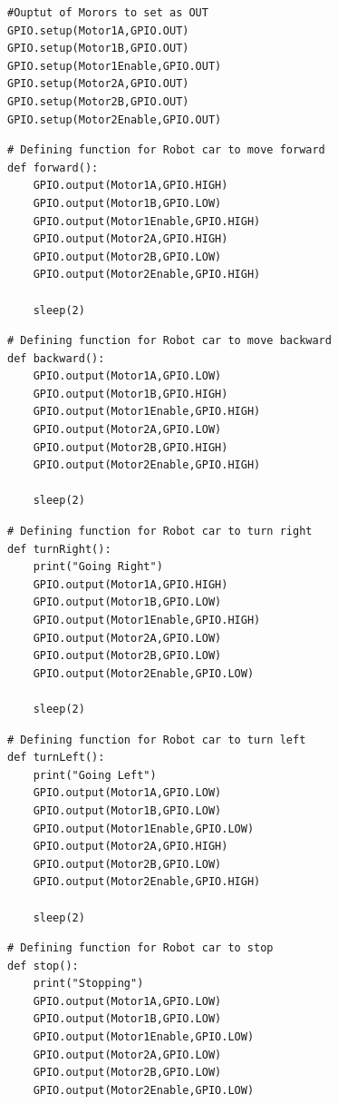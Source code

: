 \documentclass[sigconf]{acmart}
\begin{document}
\begin{verbatim}
#Ouptut of Morors to set as OUT
GPIO.setup(Motor1A,GPIO.OUT)
GPIO.setup(Motor1B,GPIO.OUT)
GPIO.setup(Motor1Enable,GPIO.OUT)
GPIO.setup(Motor2A,GPIO.OUT)
GPIO.setup(Motor2B,GPIO.OUT)
GPIO.setup(Motor2Enable,GPIO.OUT)

\end{verbatim}

\begin{verbatim}
# Defining function for Robot car to move forward
def forward():
	GPIO.output(Motor1A,GPIO.HIGH)
	GPIO.output(Motor1B,GPIO.LOW)
	GPIO.output(Motor1Enable,GPIO.HIGH) 
	GPIO.output(Motor2A,GPIO.HIGH)
	GPIO.output(Motor2B,GPIO.LOW)
	GPIO.output(Motor2Enable,GPIO.HIGH) 

	sleep(2)
\end{verbatim}

\begin{verbatim}
# Defining function for Robot car to move backward
def backward():
	GPIO.output(Motor1A,GPIO.LOW)
	GPIO.output(Motor1B,GPIO.HIGH)
	GPIO.output(Motor1Enable,GPIO.HIGH)
	GPIO.output(Motor2A,GPIO.LOW)
	GPIO.output(Motor2B,GPIO.HIGH)
	GPIO.output(Motor2Enable,GPIO.HIGH)

	sleep(2)
\end{verbatim}

\begin{verbatim}
# Defining function for Robot car to turn right
def turnRight():
	print("Going Right")
	GPIO.output(Motor1A,GPIO.HIGH)
	GPIO.output(Motor1B,GPIO.LOW)
	GPIO.output(Motor1Enable,GPIO.HIGH)
	GPIO.output(Motor2A,GPIO.LOW)
	GPIO.output(Motor2B,GPIO.LOW)
	GPIO.output(Motor2Enable,GPIO.LOW)

	sleep(2)
\end{verbatim}

\begin{verbatim}
# Defining function for Robot car to turn left
def turnLeft():
	print("Going Left")
	GPIO.output(Motor1A,GPIO.LOW)
	GPIO.output(Motor1B,GPIO.LOW)
	GPIO.output(Motor1Enable,GPIO.LOW)
	GPIO.output(Motor2A,GPIO.HIGH)
	GPIO.output(Motor2B,GPIO.LOW)
	GPIO.output(Motor2Enable,GPIO.HIGH)

	sleep(2)
\end{verbatim}

\begin{verbatim}
# Defining function for Robot car to stop
def stop():
	print("Stopping")
	GPIO.output(Motor1A,GPIO.LOW)
	GPIO.output(Motor1B,GPIO.LOW)
	GPIO.output(Motor1Enable,GPIO.LOW)
	GPIO.output(Motor2A,GPIO.LOW)
	GPIO.output(Motor2B,GPIO.LOW)
	GPIO.output(Motor2Enable,GPIO.LOW)
\end{verbatim}
\end{document}
